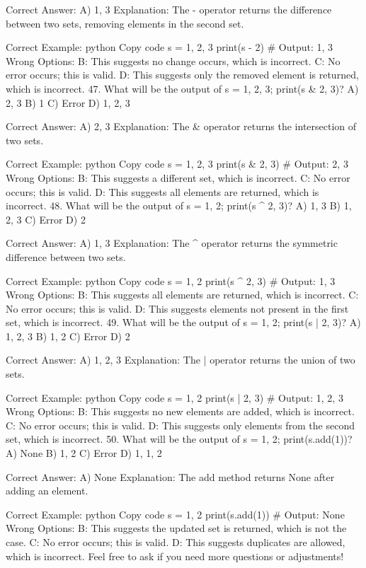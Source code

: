 Correct Answer: A) {1, 3}
Explanation: The - operator returns the difference between two sets, removing elements in the second set.

Correct Example:
python
Copy code
s = {1, 2, 3}
print(s - {2})  # Output: {1, 3}
Wrong Options:
B: This suggests no change occurs, which is incorrect.
C: No error occurs; this is valid.
D: This suggests only the removed element is returned, which is incorrect.
47. What will be the output of s = {1, 2, 3}; print(s & {2, 3})?
A) {2, 3}
B) {1}
C) Error
D) {1, 2, 3}

Correct Answer: A) {2, 3}
Explanation: The & operator returns the intersection of two sets.

Correct Example:
python
Copy code
s = {1, 2, 3}
print(s & {2, 3})  # Output: {2, 3}
Wrong Options:
B: This suggests a different set, which is incorrect.
C: No error occurs; this is valid.
D: This suggests all elements are returned, which is incorrect.
48. What will be the output of s = {1, 2}; print(s ^ {2, 3})?
A) {1, 3}
B) {1, 2, 3}
C) Error
D) {2}

Correct Answer: A) {1, 3}
Explanation: The ^ operator returns the symmetric difference between two sets.

Correct Example:
python
Copy code
s = {1, 2}
print(s ^ {2, 3})  # Output: {1, 3}
Wrong Options:
B: This suggests all elements are returned, which is incorrect.
C: No error occurs; this is valid.
D: This suggests elements not present in the first set, which is incorrect.
49. What will be the output of s = {1, 2}; print(s | {2, 3})?
A) {1, 2, 3}
B) {1, 2}
C) Error
D) {2}

Correct Answer: A) {1, 2, 3}
Explanation: The | operator returns the union of two sets.

Correct Example:
python
Copy code
s = {1, 2}
print(s | {2, 3})  # Output: {1, 2, 3}
Wrong Options:
B: This suggests no new elements are added, which is incorrect.
C: No error occurs; this is valid.
D: This suggests only elements from the second set, which is incorrect.
50. What will be the output of s = {1, 2}; print(s.add(1))?
A) None
B) {1, 2}
C) Error
D) {1, 1, 2}

Correct Answer: A) None
Explanation: The add method returns None after adding an element.

Correct Example:
python
Copy code
s = {1, 2}
print(s.add(1))  # Output: None
Wrong Options:
B: This suggests the updated set is returned, which is not the case.
C: No error occurs; this is valid.
D: This suggests duplicates are allowed, which is incorrect.
Feel free to ask if you need more questions or adjustments!


